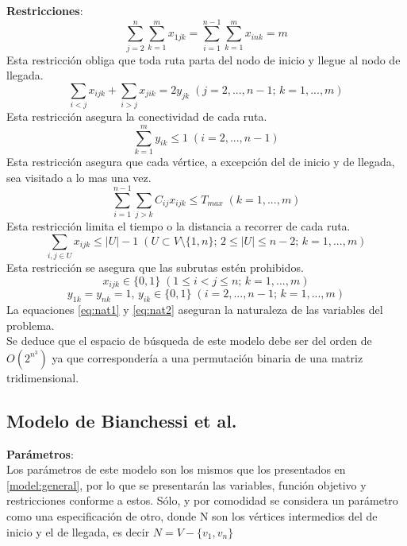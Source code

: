 \noindent
\textbf{Restricciones}:\\
\begin{equation}\label{eq:cons1}
    \sum_{j=2}^{n}\sum_{k=1}^{m}x_{1jk} = \sum_{i=1}^{n-1}\sum_{k=1}^{m}x_{ink} = m
\end{equation}
Esta restricci\'on obliga que toda ruta parta del nodo de inicio y llegue al nodo de llegada.
\begin{equation}\label{eq:cons2}
    \sum_{i<j}x_{ijk} + \sum_{i>j}x_{jik} = 2y_{jk}\; (j=2,...,n-1;\,k=1,...,m)
\end{equation}
Esta restricci\'on asegura la conectividad de cada ruta.
\begin{equation}\label{eq:cons3}
    \sum_{k=1}^{m}y_{ik} \leq 1\; (i=2,...,n-1)
\end{equation}
Esta restricci\'on asegura que cada v\'ertice, a excepci\'on del de inicio y de llegada, sea visitado a lo mas una vez.
\begin{equation}\label{eq:cons4}
    \sum_{i=1}^{n-1}\sum_{j>k}C_{ij}x_{ijk} \leq T_{max}\; (k = 1,...,m)
\end{equation}
Esta restricci\'on limita el tiempo o la distancia a recorrer de cada ruta.
\begin{equation}\label{eq:cons5}
    \sum_{i,j\in U}x_{ijk} \leq |U| - 1\; (U\subset V\setminus \{1,n\};\, 2\leq |U| \leq n-2;\, k=1,...,m)
\end{equation}
Esta restricci\'on se asegura que las subrutas est\'en prohibidos.
\begin{equation}\label{eq:nat1}
    x_{ijk} \in \{0,1\} \; (1\leq i < j \leq n;\, k = 1,...,m)
\end{equation}
\begin{equation}\label{eq:nat2}
    y_{1k} = y_{nk} = 1,\, y_{ik}\in \{0,1\}\; (i=2,...,n-1;\, k=1,...,m)
\end{equation}
La equaciones \eqref{eq:nat1} y \eqref{eq:nat2} aseguran la naturaleza de las variables del problema.\\
Se deduce que el espacio de b\'usqueda de este modelo debe ser del orden de $O(2^{n^3})$ ya que corresponder\'ia a una permutaci\'on binaria de una matriz tridimensional.

\subsection{Modelo de Bianchessi et al.}\label{model:bian}
\noindent
\textbf{Par\'ametros}:\\
\indent Los par\'ametros de este modelo son los mismos que los presentados en \ref{model:general}, por lo que se presentar\'an las variables, funci\'on objetivo y restricciones conforme a estos. S\'olo, y por comodidad se considera un par\'ametro como una especificaci\'on de otro, donde N son los v\'ertices intermedios del de inicio y el de llegada, es decir $N = V - \{v_1,v_n\}$\\

